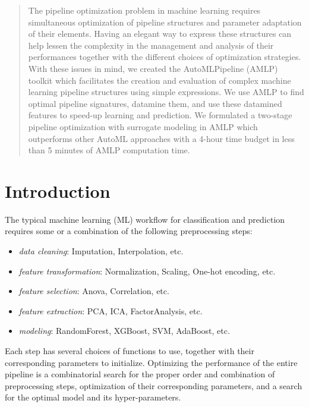 \documentclass{juliacon}
\begin{document}


\maketitle

\begin{abstract}
 The pipeline optimization problem in machine learning requires simultaneous
  optimization of pipeline structures and parameter adaptation of their
  elements. Having an elegant way to express these structures can help lessen
  the complexity in the management and analysis of their performances together
  with the different choices of optimization strategies. With these issues in
  mind, we created the AutoMLPipeline (AMLP) toolkit which facilitates the creation and
  evaluation of complex machine learning pipeline structures using simple
  expressions.  We use AMLP to find optimal pipeline signatures, 
  datamine them, and use these datamined features to speed-up learning
  and prediction. We formulated a two-stage pipeline optimization 
  with surrogate modeling in AMLP which outperforms other AutoML 
  approaches with a 4-hour time budget in less than 5 minutes of AMLP
  computation time. 
\end{abstract}

\section{Introduction}
\label{intro}

The typical machine learning (ML) workflow for classification and prediction
requires some or a combination of the following preprocessing steps:
\begin{itemize}
\item \emph{data cleaning}: Imputation, Interpolation, etc.
\item \emph{feature transformation}: Normalization, Scaling, One-hot encoding, etc.
\item \emph{feature selection}: Anova, Correlation, etc.
\item \emph{feature extraction}: PCA, ICA, FactorAnalysis, etc.
\item \emph{modeling}: RandomForest, XGBoost, SVM, AdaBoost, etc.
\end{itemize}

Each step has several choices of functions to use, together with their
corresponding parameters to initialize. Optimizing the performance of the
entire pipeline is a combinatorial search for the proper order and combination
of preprocessing steps, optimization of their corresponding parameters,
and a search for the optimal model and its hyper-parameters.
\end{document}
